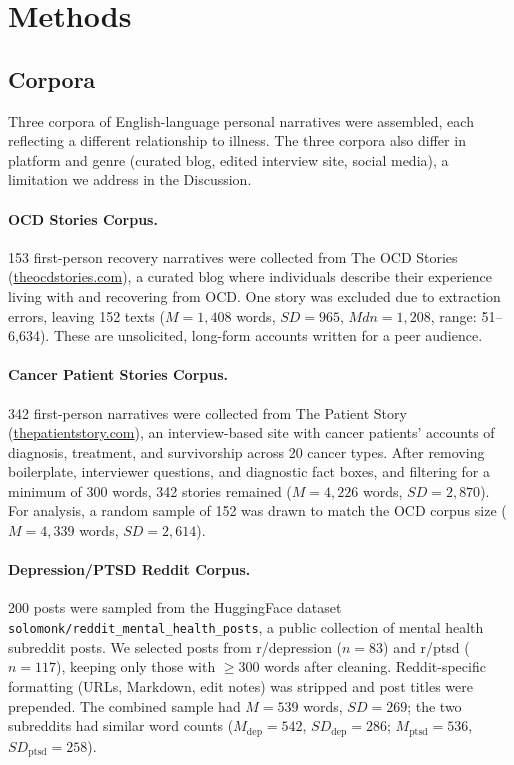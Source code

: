\documentclass[11pt,a4paper]{article}
\begin{document}
\section{Methods}

\subsection{Corpora}

Three corpora of English-language personal narratives were assembled, each reflecting a different relationship to illness. The three corpora also differ in platform and genre (curated blog, edited interview site, social media), a limitation we address in the Discussion.

\paragraph{OCD Stories Corpus.}
153 first-person recovery narratives were collected from The OCD Stories (\url{theocdstories.com}), a curated blog where individuals describe their experience living with and recovering from OCD. One story was excluded due to extraction errors, leaving 152 texts ($M = 1{,}408$ words, $SD = 965$, $Mdn = 1{,}208$, range: 51--6,634). These are unsolicited, long-form accounts written for a peer audience.

\paragraph{Cancer Patient Stories Corpus.}
342 first-person narratives were collected from The Patient Story (\url{thepatientstory.com}), an interview-based site with cancer patients' accounts of diagnosis, treatment, and survivorship across 20 cancer types. After removing boilerplate, interviewer questions, and diagnostic fact boxes, and filtering for a minimum of 300 words, 342 stories remained ($M = 4{,}226$ words, $SD = 2{,}870$). For analysis, a random sample of 152 was drawn to match the OCD corpus size ($M = 4{,}339$ words, $SD = 2{,}614$).

\paragraph{Depression/PTSD Reddit Corpus.}
200 posts were sampled from the HuggingFace dataset \texttt{solomonk/reddit\_mental\_health\_posts}, a public collection of mental health subreddit posts. We selected posts from r/depression ($n = 83$) and r/ptsd ($n = 117$), keeping only those with $\geq$300 words after cleaning. Reddit-specific formatting (URLs, Markdown, edit notes) was stripped and post titles were prepended. The combined sample had $M = 539$ words, $SD = 269$; the two subreddits had similar word counts ($M_\mathrm{dep} = 542$, $SD_\mathrm{dep} = 286$; $M_\mathrm{ptsd} = 536$, $SD_\mathrm{ptsd} = 258$).
\end{document}
